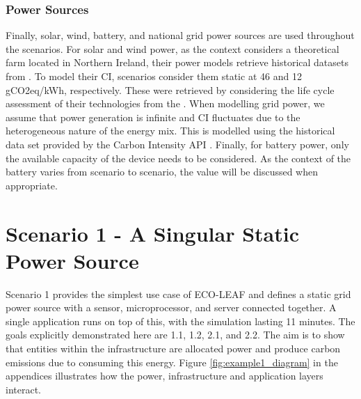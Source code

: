 \documentclass{l4proj}
\begin{document}
\subsubsection{Power Sources}
Finally, solar, wind, battery, and national grid power sources are used throughout the scenarios.
For solar and wind power, as the context considers a theoretical farm located in Northern Ireland, their power models retrieve historical datasets from \cite{eirgrid}.
To model their CI, scenarios consider them static at 46 and 12 gCO2eq/kWh, respectively.
These were retrieved by considering the life cycle assessment of their technologies from the \cite{ipcc_synthesis_2014}.
When modelling grid power, we assume that power generation is infinite and CI fluctuates due to the heterogeneous nature of the energy mix.
This is modelled using the historical data set provided by the Carbon Intensity API \citep{carbon_intensity_api}.
Finally, for battery power, only the available capacity of the device needs to be considered.
As the context of the battery varies from scenario to scenario, the value will be discussed when appropriate.
\clearpage

\section{Scenario 1 - A Singular Static Power Source}\label{eval:subsec:scenario1}
Scenario 1 provides the simplest use case of ECO-LEAF and defines a static grid power source with a sensor, microprocessor, and server connected together.
A single application runs on top of this, with the simulation lasting 11 minutes.
The goals explicitly demonstrated here are 1.1, 1.2, 2.1, and 2.2.
The aim is to show that entities within the infrastructure are allocated power and produce carbon emissions due to consuming this energy.
Figure \ref{fig:example1_diagram} in the appendices illustrates how the power, infrastructure and application layers interact.
\end{document}
